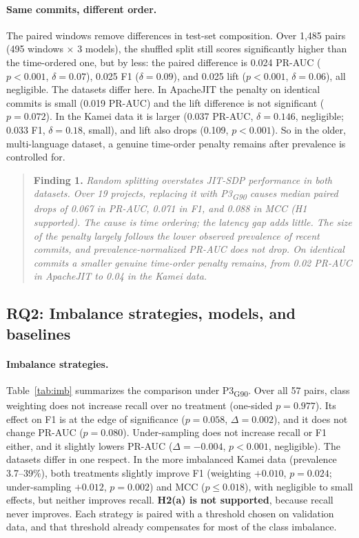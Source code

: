 \documentclass[11pt,a4paper]{article}
\newcommand{\finding}[2]{\begin{quote}\noindent\textbf{Finding #1.} \emph{#2}\end{quote}}
\newcommand{\pthree}{P3\textsubscript{G90}}
\begin{document}
\paragraph{Same commits, different order.} The paired windows remove differences in test-set composition. Over 1{,}485 pairs (495 windows $\times$ 3 models), the shuffled split still scores significantly higher than the time-ordered one, but by less: the paired difference is 0.024 PR-AUC ($p<0.001$, $\delta=0.07$), 0.025 F1 ($\delta=0.09$), and 0.025 lift ($p<0.001$, $\delta=0.06$), all negligible. The datasets differ here. In ApacheJIT the penalty on identical commits is small (0.019 PR-AUC) and the lift difference is not significant ($p=0.072$). In the Kamei data it is larger (0.037 PR-AUC, $\delta=0.146$, negligible; 0.033 F1, $\delta=0.18$, small), and lift also drops (0.109, $p<0.001$). So in the older, multi-language dataset, a genuine time-order penalty remains after prevalence is controlled for.

\finding{1}{Random splitting overstates JIT-SDP performance in both datasets. Over 19 projects, replacing it with \pthree{} causes median paired drops of 0.067 in PR-AUC, 0.071 in F1, and 0.088 in MCC (H1 supported). The cause is time ordering; the latency gap adds little. The size of the penalty largely follows the lower observed prevalence of recent commits, and prevalence-normalized PR-AUC does not drop. On identical commits a smaller genuine time-order penalty remains, from 0.02 PR-AUC in ApacheJIT to 0.04 in the Kamei data.}

\subsection{RQ2: Imbalance strategies, models, and baselines}\label{sec:rq2}

\paragraph{Imbalance strategies.} Table~\ref{tab:imb} summarizes the comparison under \pthree. Over all 57 pairs, class weighting does not increase recall over no treatment (one-sided $p=0.977$). Its effect on F1 is at the edge of significance ($p=0.058$, $\Delta=0.002$), and it does not change PR-AUC ($p=0.080$). Under-sampling does not increase recall or F1 either, and it slightly lowers PR-AUC ($\Delta=-0.004$, $p<0.001$, negligible). The datasets differ in one respect. In the more imbalanced Kamei data (prevalence 3.7--39\%), both treatments slightly improve F1 (weighting $+0.010$, $p=0.024$; under-sampling $+0.012$, $p=0.002$) and MCC ($p\le0.018$), with negligible to small effects, but neither improves recall. \textbf{H2(a) is not supported}, because recall never improves. Each strategy is paired with a threshold chosen on validation data, and that threshold already compensates for most of the class imbalance.
\end{document}
